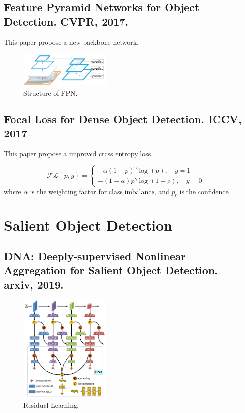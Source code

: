 \documentclass[10pt,onecolumn]{book}
\begin{document}
\section{Feature Pyramid Networks for Object Detection. CVPR, 2017.}
This paper propose a new backbone network.
\begin{figure}[h]
\centering
\includegraphics[width=0.4\textwidth]{figures_paper_reading/fpn.png}
\caption{Structure of FPN.}
\end{figure}

\section{Focal Loss for Dense Object Detection. ICCV, 2017}
This paper propose a improved cross entropy loss.

\begin{equation}
\mathcal{FL}(p, y) =
\left\{
\begin{split}
- \alpha (1-p)^\gamma \log(p), \quad y = 1 \\
- (1-\alpha) p^\gamma \log(1-p), \quad y = 0
\end{split}
\right.
\end{equation}
where $\alpha$ is the weighting factor for class imbalance, and $p_t$ is the confidence 

\chapter{Salient Object Detection}
\section{DNA: Deeply-supervised Nonlinear Aggregation for Salient Object Detection. arxiv, 2019.}
\begin{figure}[h]
\centering
\includegraphics[width=0.4\textwidth]{figures_paper_reading/DNA_Deeply-supervised_Nonlinear_Aggregation_for_Salient_Object_Detection.png}
\caption{Residual Learning.}
\end{figure}
\end{document}
